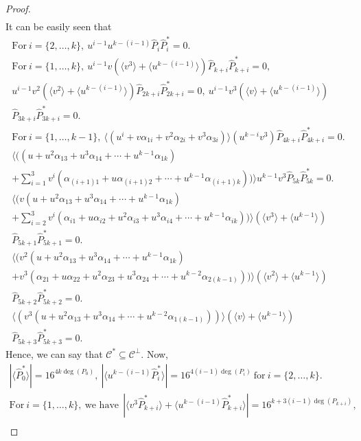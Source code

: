 \documentclass{amsart}
\theoremstyle{definition}
\theoremstyle{remark}
\numberwithin{equation}{section}
\begin{document}
\begin{proof}
\begin{gather*}
    \end{gather*}
It can be easily seen that
\allowdisplaybreaks\begin{gather*} \text{For} ~i = \{2,\dots,k\}, ~ u^{i-1}u^{k-(i-1)}\hat{P}_i\hat{P}_i^* = 0. \\ \text{For} ~ i = \{1,\dots,k\},~ u^{i-1}v (\langle v^3 \rangle + \langle u^{k-(i-1)} \rangle ) \hat{P}_{k+i}\hat{P}_{k+i}^* = 0, \\ u^{i-1}v^2 (\langle v^2 \rangle + \langle u^{k-(i-1)} \rangle ) \hat{P}_{2k+i}\hat{P}_{2k+i}^* = 0 ,~  u^{i-1}v^3 (\langle v \rangle + \langle u^{k-(i-1)} \rangle ) \\ \hat{P}_{3k+i}\hat{P}_{3k+i}^* = 0. \\
    \text{For} ~ i = \{1,\dots,k-1\}, ~  \langle (u^i+ v\alpha_{1i} + v^2\alpha_{2i} + v^3\alpha_{3i})\rangle (u^{k-i}v^3)   \hat{P}_{4k+i}\hat{P}_{4k+i}^* = 0. \\
    \langle ((u + u^2\alpha_{13} + u^3\alpha_{14} + \cdots + u^{k-1}\alpha_{1k})
     \\ + \sum_{i=1}^{3} v^i( \alpha_{(i+1)1} + u\alpha_{(i+1)2}  + \cdots + u^{k-1}\alpha_{(i+1)k} ))\rangle u^{k-1}v^3 \hat{P}_{5k}\hat{P}_{5k}^* = 0. \\
      \langle (v(u + u^2\alpha_{13} + u^3\alpha_{14} + \cdots + u^{k-1}\alpha_{1k})
     \\ + \sum_{i=2}^{3} v^i( \alpha_{i1} + u\alpha_{i2} + u^2\alpha_{i3} + u^3\alpha_{i4} + \cdots + u^{k-1}\alpha_{ik} )) \rangle (\langle v^3 \rangle + \langle u^{k-1} \rangle)\\ \hat{P}_{5k+1}\hat{P}_{5k+1}^* = 0. \\
       \langle (v^2(u + u^2\alpha_{13} + u^3\alpha_{14} + \cdots + u^{k-1}\alpha_{1k})
     \\ + v^3( \alpha_{21} + u\alpha_{22} + u^2\alpha_{23} + u^3\alpha_{24} + \cdots + u^{k-2}\alpha_{2(k-1)}))\rangle(\langle v^2 \rangle + \langle u^{k-1} \rangle)\\ \hat{P}_{5k+2}\hat{P}_{5k+2}^* = 0. \\
     \langle (v^3(u + u^2\alpha_{13} + u^3\alpha_{14} + \cdots + u^{k-2}\alpha_{1(k-1)}))\rangle (\langle v \rangle + \langle u^{k-1} \rangle)  \\\hat{P}_{5k+3}\hat{P}_{5k+3}^* = 0. \end{gather*}
     Hence, we can say that $\mathcal{C}^* \subseteq \mathcal{C}^\perp $. 
     Now,
     \allowdisplaybreaks
      \begin{gather*}
|\langle\hat{P}_{0}^*\rangle| = 16^{4k\deg(P_0)},  ~|\langle u^{k-(i-1)}\hat{P}_{i}^*\rangle| = 16^{4(i-1)\deg(P_i)} ~\text{for} ~i = \{2,\dots,k\}. \\  \text{For} ~i = \{1,\dots,k\}, ~\text{we have}~~ |\langle v^3 \hat{P}_{k+i}^* \rangle + \langle u^{k-(i-1)} \hat{P}_{k+i}^* \rangle| = 16^{k+3(i-1)\deg(P_{k+i})}, \\

\end{gather*}
\end{proof}
\end{document}
